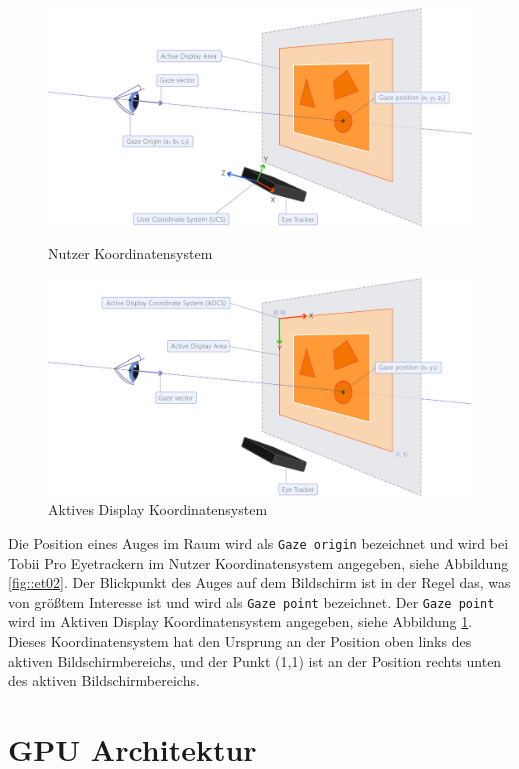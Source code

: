 \begin{figure}[]
	\centering
	\begin{minipage}[b]{0.49\textwidth}
		\centering
		\includegraphics[width=1\textwidth]{../../Grafiken/UCS.png}
		\caption{Nutzer Koordinatensystem \cite{tobiisdk}}
		\label{fig::et02}
	\end{minipage}
	\hfill
	\begin{minipage}[b]{0.49\textwidth}
		\centering
		\includegraphics[width=1\textwidth]{../../Grafiken/ADCS.png}
		\caption{Aktives Display Koordinatensystem \cite{tobiisdk}}
		\label{fig::et03}
	\end{minipage}
\end{figure}
Die Position eines Auges im Raum wird als \texttt{Gaze origin} bezeichnet und wird bei Tobii Pro Eyetrackern im Nutzer Koordinatensystem angegeben, siehe Abbildung \ref{fig::et02}.
Der Blickpunkt des Auges auf dem Bildschirm ist in der Regel das, was von größtem Interesse ist und wird als \texttt{Gaze point} bezeichnet.
Der \texttt{Gaze point} wird im Aktiven Display Koordinatensystem angegeben, siehe Abbildung \ref{fig::et03}.
Dieses Koordinatensystem hat den Ursprung an der Position oben links des aktiven Bildschirmbereichs, und der Punkt (1,1) ist an der Position rechts unten des aktiven Bildschirmbereichs.

\section{GPU Architektur}\label{sec::gpuarc}
